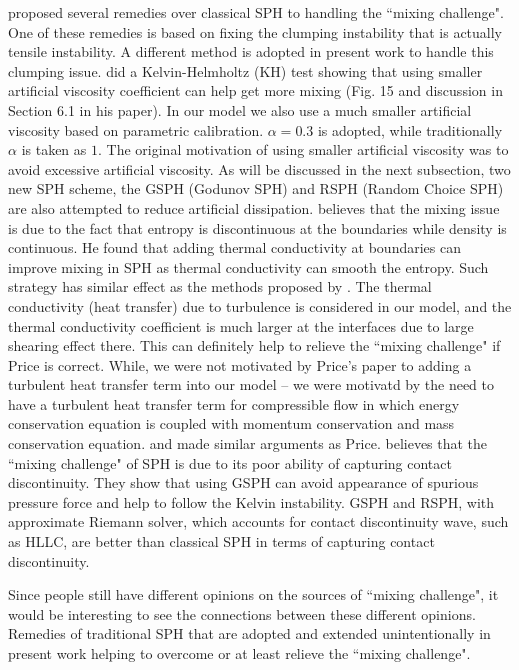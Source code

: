 \citet{read2010resolving} proposed several remedies over classical SPH to handling the ``mixing challenge". One of these remedies is based on fixing the clumping instability that is actually tensile instability. A different method \citep{chen1999improvement} is adopted in present work to handle this clumping issue. \citet{agertz2007fundamental} did a Kelvin-Helmholtz (KH) test showing that using smaller artificial viscosity coefficient can help get more mixing (Fig. 15 and discussion in Section 6.1 in his paper). In our model we also use a much smaller artificial viscosity based on parametric calibration. $\alpha =0.3$ is adopted, while traditionally $\alpha$ is taken as $1$. The original motivation of using smaller artificial viscosity was to avoid excessive artificial viscosity. As will be discussed in the next subsection, two new SPH scheme, the GSPH (Godunov SPH) and RSPH (Random Choice SPH) are also attempted to reduce artificial dissipation. \citet{price2008modelling} believes that the mixing issue is due to the fact that entropy is discontinuous at the boundaries while density is continuous. He found that adding thermal conductivity at boundaries can improve mixing in SPH as thermal conductivity can smooth the entropy. Such strategy has similar effect as the methods proposed by \citet{read2010resolving}. The thermal conductivity (heat transfer) due to turbulence is considered in our model, and the thermal conductivity coefficient is much larger at the interfaces due to large shearing effect there. This can definitely help to relieve the ``mixing challenge" if Price is correct. While, we were not motivated by Price's paper to adding a turbulent heat transfer term into our model -- we were motivatd by the need to have a turbulent heat transfer term for compressible flow in which energy conservation equation is coupled with momentum conservation and mass conservation equation.
\citet{wadsley2008treatment} and \citet{ritchie2001multiphase} made similar arguments as Price. \citet{borgani2012hydrodynamic} believes that the ``mixing challenge" of SPH is due to its poor ability of capturing contact discontinuity. They show that using GSPH can avoid appearance of spurious pressure force and help to follow the Kelvin instability. GSPH and RSPH, with approximate Riemann solver, which accounts for contact discontinuity wave, such as HLLC, are better than classical SPH in terms of capturing contact discontinuity.

Since people still have different opinions on the sources of ``mixing challenge", it would be interesting to see the connections between these different opinions. Remedies of traditional SPH that are adopted and extended unintentionally in present work helping to overcome or at least relieve the ``mixing challenge".

